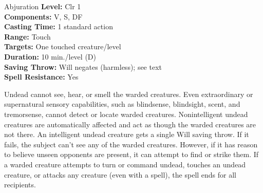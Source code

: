 {Abjuration}
{
	\textbf{Level:}
	Clr 1\\
	\textbf{Components:}
	V, S, DF\\
	\textbf{Casting Time:}
	1 standard action\\
	\textbf{Range:}
	Touch\\
	\textbf{Targets:}
	One touched creature/level\\
	\textbf{Duration:}
	10 min./level (D)\\
	\textbf{Saving Throw:}
	Will negates (harmless); see text\\
	\textbf{Spell Resistance:}
	Yes\\
}
{
	Undead cannot see, hear, or smell the warded creatures. Even extraordinary or supernatural sensory capabilities, such as blindsense, blindsight, scent, and tremorsense, cannot detect or locate warded creatures. Nonintelligent undead creatures are automatically affected and act as though the warded creatures are not there. An intelligent undead creature gets a single Will saving throw. If it fails, the subject can't see any of the warded creatures. However, if it has reason to believe unseen opponents are present, it can attempt to find or strike them. If a warded creature attempts to turn or command undead, touches an undead creature, or attacks any creature (even with a spell), the spell ends for all recipients.

}
